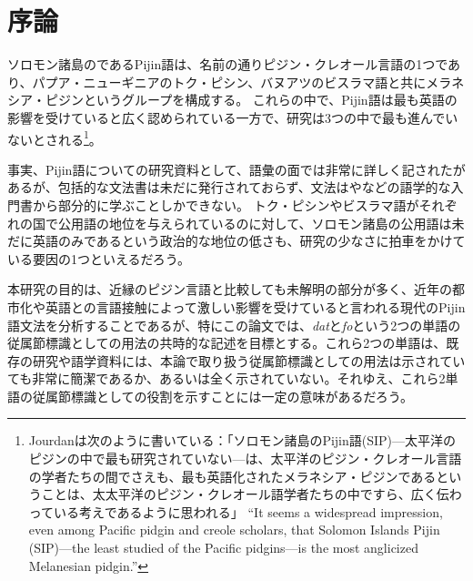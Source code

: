 \chapter{序論}

%

ソロモン諸島のであるPijin語は、名前の通りピジン・クレオール言語の1つであり、パプア・ニューギニアのトク・ピシン、バヌアツのビスラマ語と共にメラネシア・ピジンというグループを構成する。
これらの中で、Pijin語は最も英語の影響を受けていると広く認められている一方で、研究は3つの中で最も進んでいないとされる\footnote{
  Jourdanは次のように書いている：「ソロモン諸島のPijin語(SIP)---太平洋のピジンの中で最も研究されていない---は、太平洋のピジン・クレオール言語の学者たちの間でさえも、最も英語化されたメラネシア・ピジンであるということは、太太平洋のピジン・クレオール語学者たちの中ですら、広く伝わっている考えであるように思われる」
  ``It seems a widespread impression, even among Pacific pidgin and creole scholars, that Solomon Islands Pijin (SIP)---the least studied of the Pacific pidgins---is the most anglicized Melanesian pidgin.''\citep{nativization}
}\citep{nativization}。

事実、Pijin語についての研究資料として、語彙の面では非常に詳しく記された\cite{dictionary}があるが、包括的な文法書は未だに発行されておらず\citep{phonology}、文法は\cite{yumi}や\cite{eric}などの語学的な入門書から部分的に学ぶことしかできない。
トク・ピシンやビスラマ語がそれぞれの国で公用語の地位を与えられているのに対して、ソロモン諸島の公用語は未だに英語のみであるという政治的な地位の低さも、研究の少なさに拍車をかけている要因の1つといえるだろう。

本研究の目的は、近縁のピジン言語と比較しても未解明の部分が多く、近年の都市化や英語との言語接触によって激しい影響を受けていると言われる現代のPijin語文法を分析することであるが、特にこの論文では、\textit{dat}と\textit{fo}という2つの単語の従属節標識としての用法の共時的な記述を目標とする。これら2つの単語は、既存の研究や語学資料には、本論で取り扱う従属節標識としての用法は示されていても非常に簡潔であるか、あるいは全く示されていない。それゆえ、これら2単語の従属節標識としての役割を示すことには一定の意味があるだろう。

